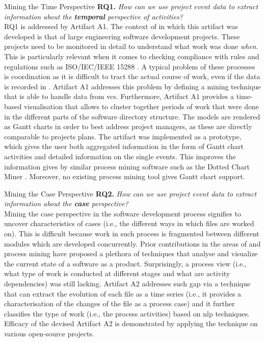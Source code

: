 \begin{question}{Mining the Time Perspective}
\textbf{RQ1.} \emph{How can we use project event data to extract information about the \textbf{temporal} perspective of activities?}\\


RQ1 is addressed by Artifact A1. The context of in which this artifact was developed is that of large engineering software development projects. These projects need to be monitored in detail to understand what work was done \emph{when}. This is particularly relevant when it comes to checking compliance with rules and regulations such as ISO/IEC/IEEE 15288 \citep{international2015iso}. A typical problem of these processes is coordination as it is difficult to tract the actual course of work, even if the data is recorded in . Artifact A1 addresses this problem by defining a mining technique that is able to handle data from \gls{vcs}. Furthermore, Artifact A1 provides a time-based visualisation that allows to cluster together periods of work that were done in the different parts of the software directory structure. The models are rendered as Gantt charts in order to best address project managers, as these are directly comparable to projects plans. The artifact was implemented as a prototype, which gives the user both aggregated information in the form of Gantt chart activities and detailed information on the single events. This improves the information gives by similar process mining software such as the Dotted Chart Miner \citep{Song2007}. Moreover, no existing process mining tool gives Gantt chart support.
\end{question}



\begin{question}{Mining the Case Perspective}
	\textbf{RQ2.} \emph{How can we use project event data to extract information about the \textbf{case} perspective?}\\
	
	
	Mining the case perspective in the software development process signifies to uncover characteristics of cases (i.e., the different ways in which files are worked on). This is difficult because work in such process is fragmented between different modules which are developed concurrently. Prior contributions in the areas of  and process mining have proposed a plethora of techniques that analyse and visualize the current state of a software as a product. Surprisingly, a process view (i.e., what type of work is conducted at different stages and what are activity dependencies) was still lacking. Artifact A2 addresses such gap via a technique that can extract the evolution of each file as a time series (i.e., it provides a characterisation of the changes of the file as a process case) and it further classifies the type of work (i.e., the process activities) based on \gls{nlp} techniques. Efficacy of the devised Artifact A2 is demonstrated by applying the technique on various open-source projects. 
\end{question}





